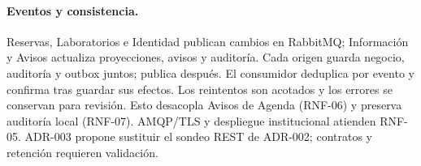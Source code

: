 \paragraph{Eventos y consistencia.}
Reservas, Laboratorios e Identidad publican cambios en RabbitMQ; Información
y Avisos actualiza proyecciones, avisos y auditoría. Cada origen guarda
negocio, auditoría y outbox juntos; publica después. El consumidor deduplica
por evento y confirma tras guardar sus efectos. Los reintentos son acotados
y los errores se conservan para revisión. Esto desacopla Avisos de Agenda
(RNF-06) y preserva auditoría local (RNF-07). AMQP/TLS y despliegue
institucional atienden RNF-05. ADR-003 propone sustituir el sondeo REST de
ADR-002; contratos y retención requieren validación\cite{nixonRabbitConfirms,nixonPfcRNF}.
